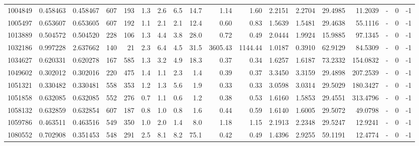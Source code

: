 \begin{tabular}{rrrrrrrrrrrrrrrlrr}
   1004849 & 0.458463 &   0.458467 &  607 &  193 &      1.3 &      2.6 &     6.5 &     14.7 &       1.14 &        1.60 &  2.2151 &  2.2704 &   29.4985 &   11.2039 &             - &        0 &         -1 \\
   1005497 & 0.653607 &   0.653605 &  607 &  192 &      1.1 &      2.1 &     2.1 &     12.4 &       0.60 &        0.83 &  1.5639 &  1.5481 &   29.4638 &   55.1116 &             - &        0 &         -1 \\
   1013889 & 0.504572 &   0.504520 &  228 &  106 &      1.3 &      4.4 &     3.8 &     28.0 &       0.72 &        0.49 &  2.0444 &  1.9924 &   15.9885 &   97.1345 &             - &        0 &         -1 \\
   1032186 & 0.997228 &   2.637662 &  140 &   21 &      2.3 &      6.4 &     4.5 &     31.5 &    3605.43 &     1144.44 &  1.0187 &  0.3910 &   62.9129 &   84.5309 &             - &        0 &         -1 \\
   1034627 & 0.620331 &   0.620278 &  167 &  585 &      1.3 &      3.2 &     4.9 &     18.3 &       0.37 &        0.34 &  1.6257 &  1.6187 &   73.2332 &  154.0832 &             - &        0 &         -1 \\
   1049602 & 0.302012 &   0.302016 &  220 &  475 &      1.4 &      1.1 &     2.3 &      1.4 &       0.39 &        0.37 &  3.3450 &  3.3159 &   29.4898 &  207.2539 &             - &        0 &         -1 \\
   1051321 & 0.330482 &   0.330481 &  558 &  353 &      1.2 &      1.3 &     5.6 &      1.9 &       0.33 &        0.33 &  3.0598 &  3.0314 &   29.5029 &  180.3427 &             - &        0 &         -1 \\
   1051858 & 0.632085 &   0.632085 &  552 &  276 &      0.7 &      1.1 &     0.6 &      1.2 &       0.38 &        0.53 &  1.6160 &  1.5853 &   29.4551 &  313.4796 &             - &        0 &         -1 \\
   1058132 & 0.632859 &   0.632854 &  607 &  187 &      0.8 &      1.0 &     0.8 &      1.6 &       0.44 &        0.59 &  1.6140 &  1.6005 &   29.5072 &   49.0798 &             - &        0 &         -1 \\
   1059786 & 0.463511 &   0.463516 &  549 &  350 &      1.0 &      2.0 &     1.4 &      8.0 &       1.18 &        1.15 &  2.1913 &  2.2348 &   29.5247 &   12.9241 &             - &        0 &         -1 \\
   1080552 & 0.702908 &   0.351453 &  548 &  291 &      2.5 &      8.1 &     8.2 &     75.1 &       0.42 &        0.49 &  1.4396 &  2.9255 &   59.1191 &   12.4774 &             - &        0 &         -1 \\

\end{tabular}

